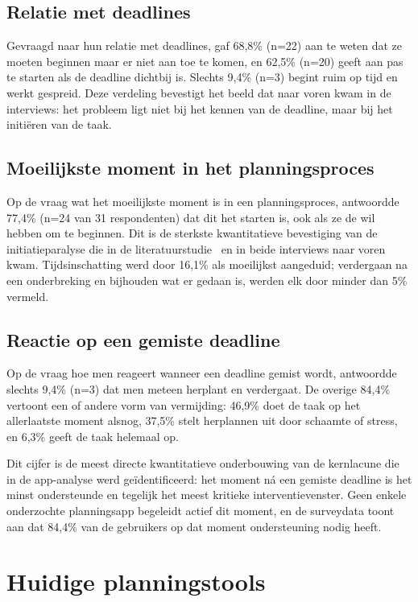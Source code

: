 \subsection{Relatie met deadlines}

Gevraagd naar hun relatie met deadlines, gaf 68,8\% (n=22) aan te weten dat ze
moeten beginnen maar er niet aan toe te komen, en 62,5\% (n=20) geeft aan pas
te starten als de deadline dichtbij is. Slechts 9,4\% (n=3) begint ruim op tijd
en werkt gespreid. Deze verdeling bevestigt het beeld dat naar voren kwam in de
interviews: het probleem ligt niet bij het kennen van de deadline, maar bij het
initiëren van de taak.

\subsection{Moeilijkste moment in het planningsproces}

Op de vraag wat het moeilijkste moment is in een planningsproces, antwoordde
77,4\% (n=24 van 31 respondenten) dat dit het starten is, ook als ze de wil
hebben om te beginnen. Dit is de sterkste kwantitatieve bevestiging van de
initiatieparalyse die in de literatuurstudie~\autocite{Barkley2022} en in beide
interviews naar voren kwam. Tijdsinschatting werd door 16,1\% als moeilijkst
aangeduid; verdergaan na een onderbreking en bijhouden wat er gedaan is, werden
elk door minder dan 5\% vermeld.

\subsection{Reactie op een gemiste deadline}

Op de vraag hoe men reageert wanneer een deadline gemist wordt, antwoordde
slechts 9,4\% (n=3) dat men meteen herplant en verdergaat. De overige 84,4\%
vertoont een of andere vorm van vermijding: 46,9\% doet de taak op het
allerlaatste moment alsnog, 37,5\% stelt herplannen uit door schaamte of stress,
en 6,3\% geeft de taak helemaal op.

Dit cijfer is de meest directe kwantitatieve onderbouwing van de kernlacune die
in de app-analyse werd geïdentificeerd: het moment ná een gemiste deadline is
het minst ondersteunde en tegelijk het meest kritieke interventievenster. Geen
enkele onderzochte planningsapp begeleidt actief dit moment, en de surveydata
toont aan dat 84,4\% van de gebruikers op dat moment ondersteuning nodig heeft.

\section{Huidige planningstools}


